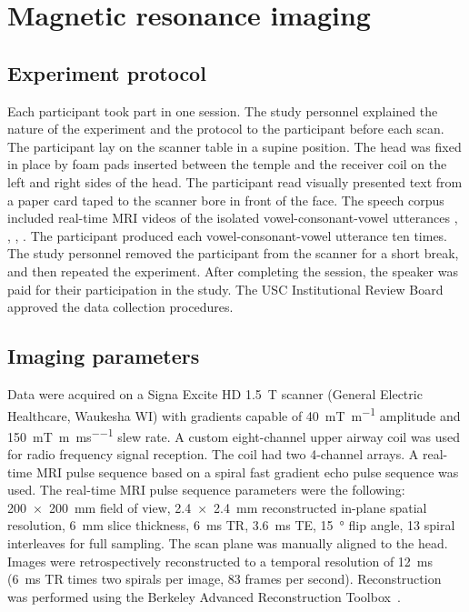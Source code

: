 \documentclass[preprint]{JASAnew}\usepackage[]{graphicx}\usepackage[]{color}
\begin{document}
\section{Magnetic resonance imaging}
\label{sec:mri}

\subsection{Experiment protocol}

Each participant took part in one session. The study personnel explained the nature of the experiment and the protocol to the participant before each scan. The participant lay on the scanner table in a supine position. The head was fixed in place by foam pads inserted between the temple and the receiver coil on the left and right sides of the head. The participant read visually presented text from a paper card taped to the scanner bore in front of the face. The speech corpus included real-time MRI videos of the isolated vowel-consonant-vowel utterances \textipa{[apa]}, \textipa{[ata]}, \textipa{[aka]}, \textipa{[aja]}. The participant produced each vowel-consonant-vowel utterance ten times. The study personnel removed the participant from the scanner for a short break, and then repeated the experiment. After completing the session, the speaker was paid for their participation in the study. The USC Institutional Review Board approved the data collection procedures. 




\subsection{Imaging parameters}

Data were acquired on a Signa Excite HD \SI{1.5}{\tesla} scanner (General Electric Healthcare, Waukesha WI) with gradients capable of \SI[per-mode=symbol]{40}{\milli\tesla\per\meter} amplitude and \SI[per-mode=repeated-symbol]{150}{\milli\tesla\per\meter\per\milli\second} slew rate. A custom eight-channel upper airway coil was used for radio frequency signal reception. The coil had two 4-channel arrays. 
%
A real-time MRI pulse sequence based on a spiral fast gradient echo pulse sequence was used. 
%
The real-time MRI pulse sequence parameters were the following: 
%
\SI{200 x 200}{\milli\meter} field of view, 
\SI{2.4 x 2.4}{\milli\meter} reconstructed in-plane spatial resolution, 
\SI{6}{\milli\meter} slice thickness,
\SI{6}{\milli\second} TR,
\SI{3.6}{\milli\second} TE,
\SI{15}{\degree} flip angle,
\num{13} spiral interleaves for full sampling.
%
The scan plane was manually aligned to the head. 
%
Images were retrospectively reconstructed to a temporal resolution of \SI{12}{\milli\second} (\SI{6}{\milli\second} TR times two spirals per image, 83 frames per second). 
%
Reconstruction was performed using the Berkeley Advanced Reconstruction Toolbox~\citep{uecker2015berkeley}.
\end{document}
